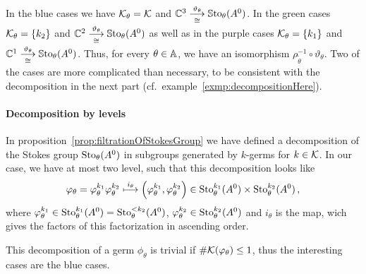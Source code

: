 In the \textcolor{blue!75!black}{blue} cases we have $\mathcal{K}_\theta=\mathcal{K}$ and
$\mathbb{C}^3\overset{\vartheta_\theta}{\underset{\cong}{\longrightarrow}}\operatorname{\mathbb{S}to}_\theta(A^0)$.
In the \textcolor{green!75!black}{green} cases $\mathcal{K}_\theta=\{k_2\}$ and
$\mathbb{C}^2\overset{\vartheta_\theta}{\underset{\cong}{\longrightarrow}}\operatorname{\mathbb{S}to}_\theta(A^0)$ as
well as in the \textcolor{purple!75!black}{purple} cases $\mathcal{K}_\theta=\{k_1\}$
and $\mathbb{C}^1\overset{\vartheta_\theta}{\underset{\cong}{\longrightarrow}}\operatorname{\mathbb{S}to}_\theta(A^0)$.
Thus, for every $\theta\in\mathbb{A}$, we have an isomorphism
$\rho_{\tilde\theta}^{-1}\circ\vartheta_\theta$.
Two of the cases are more complicated than necessary, to be consistent with
the decomposition in the next part (cf.\ example~\ref{exmp:decompositionHere}).

\paragraph{Decomposition by levels}
In proposition~\ref{prop:filtrationOfStokesGroup} we have defined a
decomposition of the Stokes group $\operatorname{Sto}_\theta(A^0)$ in subgroups generated by
$k$-germs for $k\in\mathcal{K}$.
In our case, we have at most two level, such that this decomposition looks like
\[
  \varphi_\theta=\varphi_\theta^{k_1} \varphi_\theta^{k_2}
  \overset{i_\theta}\longmapsto
    \left(\varphi_\theta^{k_1},\varphi_\theta^{k_2}\right)
      \in\operatorname{Sto}_\theta^{k_1}(A^0)\times\operatorname{Sto}_\theta^{k_2}(A^0) \,,
\]
where $\varphi_\theta^{k_1}\in\operatorname{Sto}_\theta^{k_1}(A^0)=\operatorname{Sto}_\theta^{<k_2}(A^0)$,
$\varphi_\theta^{k_2}\in\operatorname{Sto}_\theta^{k_2}(A^0)$  and $i_\theta$ is the map, wich
gives the factors of this factorization in ascending order.

This decomposition of a germ $\phi_\theta$ is trivial if
$\#\mathcal{K}(\varphi_\theta)\leq1$, thus the interesting cases are the
\textcolor{blue!75!black}{blue} cases.


